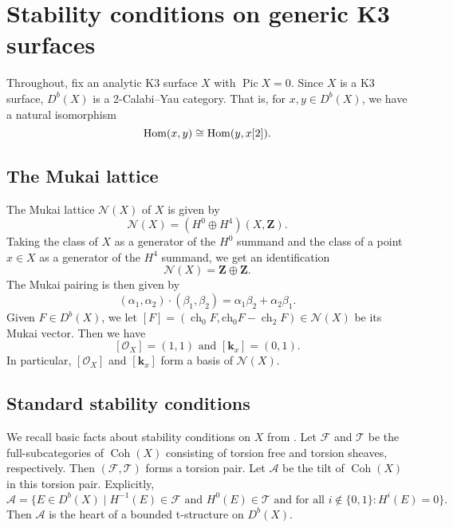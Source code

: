 \documentclass{amsart}
\begin{document}
\section{Stability conditions on generic K3 surfaces}\label{sec:stab}
Throughout, fix an analytic K3 surface \(X\) with \(\operatorname{Pic} X = 0\).
Since \(X\) is a K3 surface, \(D^b(X)\) is a 2-Calabi--Yau  category.
That is, for \(x, y \in D^b(X)\), we have a natural isomorphism \[\operatorname{Hom}(x,y) \cong \operatorname{Hom}(y,x[2]).\]

\subsection{The Mukai lattice}
The Mukai lattice \(\mathcal{N}(X)\) of \(X\) is given by
\[ \mathcal{N}(X) = (H^0 \oplus H^4) (X, \mathbf{Z}).\]
Taking the class of \(X\) as a generator of the \(H^0\) summand and the class of a point \(x \in X\) as a generator of the \(H^4\) summand, we get an identification
\[ \mathcal{N}(X) = \mathbf{Z} \oplus \mathbf{Z}.\]
The Mukai pairing is then given by
\[ (\alpha_1,\alpha_2) \cdot (\beta_1, \beta_2) = \alpha_1 \beta_2 + \alpha_2\beta_1.\]
Given \(F \in D^b(X)\), we let \([F] = (\operatorname{ch}_0F, \operatorname{ch_0}F-\operatorname{ch}_2F) \in \mathcal{N}(X)\) be its Mukai vector.
Then we have
\[ [\mathcal{O}_X] = (1,1) \text{ and } [\mathbf{k}_x] = (0,1).\]
In particular, \([\mathcal{O}_X]\) and \([\mathbf{k}_x]\) form a basis of \(\mathcal{N}(X)\).
\subsection{Standard stability conditions}
We recall basic facts about stability conditions on \(X\) from \cite[\S~4]{huy.mac.ste:08}.
Let \(\mathcal{F}\) and \(\mathcal{T}\) be the full-subcategories of \(\operatorname{Coh}(X)\) consisting of torsion free and torsion sheaves, respectively.
Then \((\mathcal{F}, \mathcal{T})\) forms a torsion pair.
Let \(\mathcal{A}\) be the tilt of \(\operatorname{Coh}(X)\) in this torsion pair.
Explicitly,
\[  \mathcal{A} = \{E \in D^b(X) \mid H^{-1}(E) \in \mathcal{F} \text{ and } H^0(E) \in \mathcal{T} \text{ and for all }i \not \in \{0,1\}: H^i(E) = 0 \}.\]
Then \(\mathcal{A}\) is the heart of a bounded t-structure on \(D^b(X)\).
\end{document}
